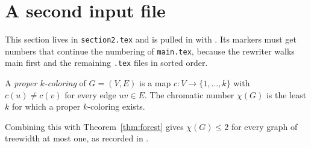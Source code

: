 \section{A second input file}

This section lives in \texttt{section2.tex} and is pulled in with
\verb||.  Its markers must get numbers that continue the numbering of
\texttt{main.tex}, because the rewriter walks main first and the remaining
\texttt{.tex} files in sorted order.

\begin{definition}
  A \emph{proper $k$-coloring} of $G = (V, E)$ is a map
  $c \colon V \to \{1, \dots, k\}$ with $c(u) \neq c(v)$ for every edge
  $uv \in E$.  The chromatic number $\chi(G)$ is the least $k$ for which a
  proper $k$-coloring exists.
\end{definition}

Combining this with Theorem~\ref{thm:forest} gives $\chi(G) \le 2$ for every
graph of treewidth at most one, as recorded in \cite{robertson1986graph}.
